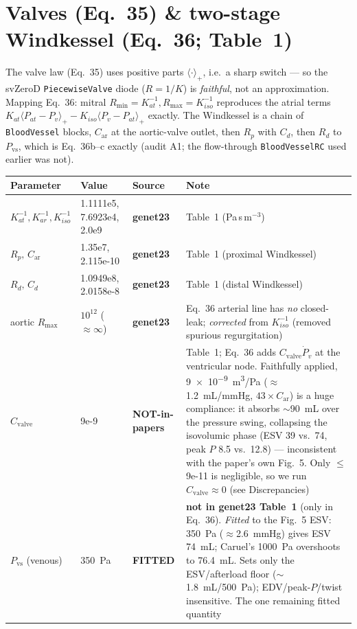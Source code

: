 \documentclass[10pt]{article}
\newcommand{\gen}{\textcolor{cgen}{\textbf{genet23}}}
\newcommand{\none}{\textcolor{cnone}{\textbf{NOT-in-papers}}}
\begin{document}
\section*{Valves (Eq.~35) \& two-stage Windkessel (Eq.~36; Table~1)}
The valve law (Eq.~35) uses positive parts $\langle\cdot\rangle_+$, i.e.\ a sharp
switch --- so the svZeroD \texttt{PiecewiseValve} diode ($R=1/K$) is \emph{faithful},
not an approximation. Mapping Eq.~36: mitral $R_{\min}{=}K_{at}^{-1},R_{\max}{=}K_{iso}^{-1}$
reproduces the atrial terms $K_{at}\langle P_{at}{-}P_v\rangle_+ - K_{iso}\langle P_v{-}P_{at}\rangle_+$ exactly.
The Windkessel is a chain of \texttt{BloodVessel} blocks,
$C_\text{ar}$ at the aortic-valve outlet, then $R_p$ with $C_d$, then $R_d$ to $P_\text{vs}$,
which is Eq.~36b--c exactly (audit A1; the flow-through \texttt{BloodVesselRC} used earlier was not).
\begin{longtable}{l l l P{6.4cm}}
\toprule Parameter & Value & Source & Note \\ \midrule\endhead
$K_{at}^{-1},K_{ar}^{-1},K_{iso}^{-1}$ & 1.1111e5, 7.6923e4, 2.0e9 & \gen & Table~1 (Pa\,s\,m$^{-3}$) \\
$R_p,\,C_\text{ar}$ & 1.35e7, 2.115e-10 & \gen & Table~1 (proximal Windkessel) \\
$R_d,\,C_d$ & 1.0949e8, 2.0158e-8 & \gen & Table~1 (distal Windkessel) \\
aortic $R_{\max}$ & $10^{12}$ ($\approx\infty$) & \gen & Eq.~36 arterial line has \emph{no} closed-leak; \emph{corrected} from $K_{iso}^{-1}$ (removed spurious regurgitation) \\
$C_\text{valve}$ & 9e-9 & \none & Table~1; Eq.~36 adds $C_\text{valve}\dot P_v$ at the ventricular node. Faithfully applied, \SI{9e-9}{m^3/Pa} ($\approx$\SI{1.2}{mL/mmHg}, $43\times C_\text{ar}$) is a huge compliance: it absorbs $\sim$\SI{90}{mL} over the pressure swing, collapsing the isovolumic phase (ESV 39 vs.\ 74, peak $P$ 8.5 vs.\ 12.8) --- inconsistent with the paper's own Fig.~5. Only $\le$9e-11 is negligible, so we run $C_\text{valve}{\approx}0$ (see Discrepancies) \\
$P_\text{vs}$ (venous) & \SI{350}{Pa} & \textcolor{cnone}{\textbf{FITTED}} & \textbf{not in genet23 Table~1} (only in Eq.~36). \emph{Fitted} to the Fig.~5 ESV: \SI{350}{Pa} ($\approx$\SI{2.6}{mmHg}) gives ESV \SI{74}{mL}; Caruel's \SI{1000}{Pa} overshoots to \SI{76.4}{mL}. Sets only the ESV/afterload floor ($\sim$\SI{1.8}{mL}/\SI{500}{Pa}); EDV/peak-$P$/twist insensitive. The one remaining fitted quantity \\
\bottomrule
\end{longtable}
\end{document}
